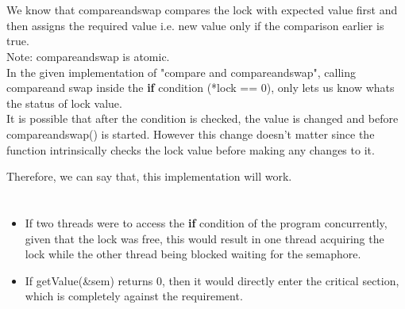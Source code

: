 \documentclass[12pt]{article}
\begin{document}
\section{}
We know that compare\textunderscore and\textunderscore swap compares the lock with expected value first and then assigns the required value i.e. new value only if the comparison earlier is true.\\
Note: compare\textunderscore and\textunderscore swap is atomic.\\
In the given implementation of "compare and compare\textunderscore and\textunderscore swap",
calling compare\textunderscore and \textunderscore swap inside the \textbf{if} condition
(*lock == 0), only lets us know whats the status of lock value. \\
It is possible that after the condition is checked, the value is changed and before
compare\textunderscore and\textunderscore swap() is started. However this change doesn’t matter since the function intrinsically checks the lock value before making any
changes to it.

Therefore, we can say that, this implementation will work.

\section{}
\begin{itemize}
\item If two threads were to access the \textbf{if} condition of the program concurrently, given that the lock was free, this would result in one thread acquiring the lock while the other thread being blocked waiting for the semaphore.
\item If getValue(\&sem) returns 0, then it would directly enter the critical section, which is completely against the requirement.
\end{itemize}
\end{document}

